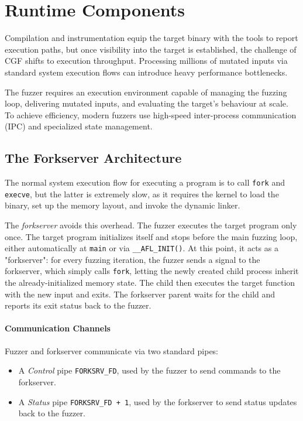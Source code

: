 \section{Runtime Components}

Compilation and instrumentation equip the target binary with the tools to report execution paths, but once visibility into the target is established, the challenge of CGF shifts to execution throughput. Processing millions of mutated inputs via standard system execution flows can introduce heavy performance bottlenecks.

The fuzzer requires an execution environment capable of managing the fuzzing loop, delivering mutated inputs, and evaluating the target's behaviour at scale. To achieve efficiency, modern fuzzers use high-speed inter-process communication (IPC) and specialized state management.

\subsection{The Forkserver Architecture}

The normal system execution flow for executing a program is to call \texttt{fork} and \texttt{execve}, but the latter is extremely slow, as it requires the kernel to load the binary, set up the memory layout, and invoke the dynamic linker. 

The \textit{forkserver} avoids this overhead. The fuzzer executes the target program only once. The target program initializes itself and stops before the main fuzzing loop, either automatically at \texttt{main} or via \texttt{\_\_AFL\_INIT()}. At this point, it acts as a "forkserver": for every fuzzing iteration, the fuzzer sends a signal to the forkserver, which simply calls \texttt{fork}, letting the newly created child process inherit the already-initialized memory state. The child then executes the target function with the new input and exits. The forkserver parent waits for the child and reports its exit status back to the fuzzer.

\paragraph{Communication Channels} Fuzzer and forkserver communicate via two standard pipes: 
\begin{itemize}
    \item A \textit{Control} pipe \texttt{FORKSRV\_FD}, used by the fuzzer to send commands to the forkserver.

    \item A \textit{Status} pipe \texttt{FORKSRV\_FD + 1}, used by the forkserver to send status updates back to the fuzzer.
\end{itemize}

